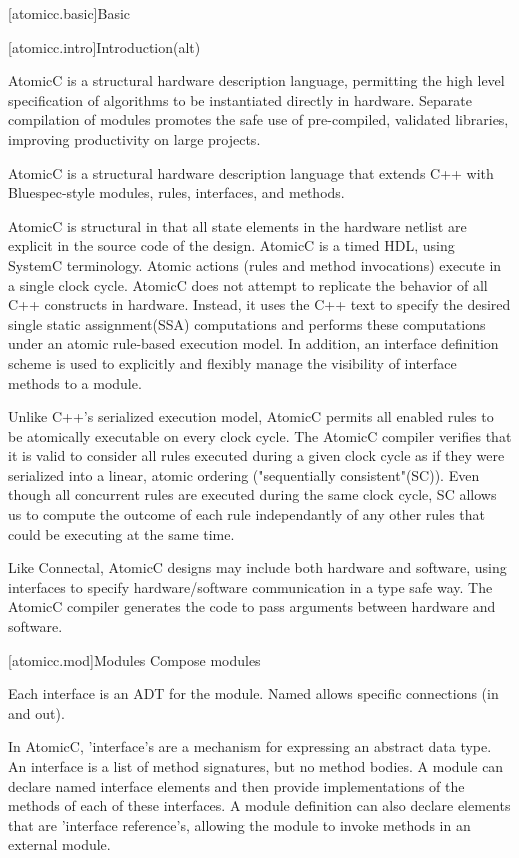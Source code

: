 [atomicc.basic]{Basic}

[atomicc.intro]{Introduction(alt)}

AtomicC is a structural hardware description language, permitting
the high level specification of algorithms to be instantiated
directly in hardware.
Separate compilation of modules promotes the safe use of pre-compiled, validated
libraries, improving productivity on large projects.

AtomicC is a structural hardware description language that extends C++
with Bluespec-style\cite{Bluespec:www,Hoe:Thesis,HoeArvind:TRS_Synthesis2}
modules, rules, interfaces, and methods.

AtomicC is structural in that all state elements in the hardware
netlist are explicit in the source code of the design. AtomicC is a
timed HDL, using SystemC terminology. 
Atomic actions (rules and method invocations) execute in a single clock cycle.
AtomicC does not attempt to replicate the behavior of all C++ constructs in hardware.
Instead, it uses the C++ text to specify the desired single static assignment(SSA) computations
and performs these computations under an atomic rule-based execution model.
In addition, an interface definition scheme is used to explicitly and flexibly
manage the visibility of interface methods to a module.

Unlike C++'s serialized execution model, AtomicC permits all enabled rules to be atomically executable on
every clock cycle.  The AtomicC compiler verifies that it is valid to consider
all rules executed during a given clock cycle
as if they were serialized into a linear, atomic ordering ("sequentially consistent"(SC)).
Even though all concurrent rules are executed during the same clock cycle, SC allows us to compute the
outcome of each rule independantly of any other rules that could be executing at the same time.

Like Connectal, AtomicC designs may include both hardware and
software, using interfaces to specify hardware/software communication
in a type safe way. The AtomicC compiler generates the code to pass
arguments between hardware and software.

[atomicc.mod]{Modules}
Compose modules

Each interface is an ADT for the module.  Named allows specific connections (in and out).

In AtomicC, 'interface's are a mechanism for expressing an abstract data type\cite{Liskov74programmingwith}.
An interface
is a list of method signatures, but no method bodies.
A module can declare named interface elements and then provide implementations of
the methods of each of these interfaces.  A module definition can also declare
elements that are 'interface reference's, allowing the module to invoke methods
in an external module.

